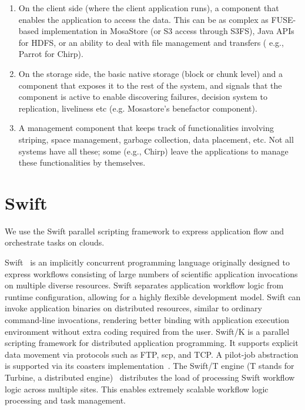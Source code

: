 \documentclass[10pt,journal,cspaper,compsoc]{IEEEtran}
\begin{document}
\begin{enumerate}
\item On the client side (where the client application runs), a component
    that enables the application to access the data.  This can be as complex as
    FUSE-based implementation in MosaStore (or S3 access through S3FS),
    Java APIs for HDFS, or an ability to deal with file
    management and transfers ( e.g., Parrot for Chirp).

\item On the storage side, the basic native storage (block or chunk level) and a
    component that exposes it to the rest of the system, and signals that the
    component is active to enable discovering failures, decision system to
    replication, liveliness etc (e.g. Mosastore's benefactor component). 

\item A management component that keeps track of functionalities involving
    striping, space management, garbage collection, data placement, etc.  Not
    all systems have all these; some (e.g., Chirp) leave the applications to
    manage these functionalities by themselves.
\end{enumerate}

\section{Swift}\label{sec:swift}
We use the Swift parallel scripting framework to express application flow and
orchestrate tasks on clouds. 

Swift~\cite{Swift_2011} is an implicitly concurrent programming language
originally designed to express workflows consisting of large numbers of
scientific application invocations on multiple diverse resources. Swift
separates application workflow logic from runtime configuration, allowing for a
highly flexible development model. Swift can invoke application binaries on
distributed resources, similar to ordinary command-line invocations, rendering
better binding with application execution environment without extra coding
required from the user. Swift/K is a parallel scripting framework for
distributed application programming. It supports explicit data movement via
protocols such as FTP, scp, and TCP. A pilot-job abstraction is supported via
its coasters implementation~\cite{Coasters_UCC_2011}. The Swift/T engine (T
stands for Turbine, a distributed engine)~\cite{fi:2013} distributes the load
of processing Swift workflow logic across multiple sites. This enables
extremely scalable workflow logic processing and task management. 
\end{document}
